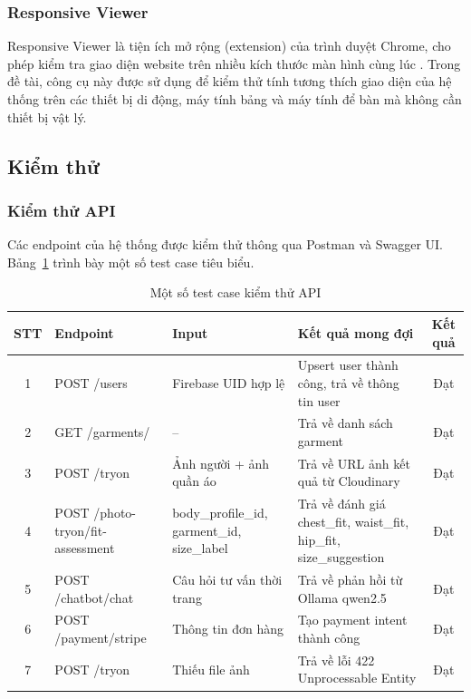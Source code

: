 \subsubsection{Responsive Viewer}
Responsive Viewer là tiện ích mở rộng (extension) của trình duyệt 
Chrome, cho phép kiểm tra giao diện website trên nhiều kích thước 
màn hình cùng lúc \cite{responsive_viewer}. Trong đề tài, công cụ 
này được sử dụng để kiểm thử tính tương thích giao diện của hệ 
thống trên các thiết bị di động, máy tính bảng và máy tính để bàn 
mà không cần thiết bị vật lý.

\subsection{Kiểm thử}

\subsubsection{Kiểm thử API}

Các endpoint của hệ thống được kiểm thử thông qua Postman và 
Swagger UI. Bảng~\ref{tab:api_test} trình bày một số test case 
tiêu biểu.
\begin{table}[H]
\centering
\caption{Một số test case kiểm thử API}
\label{tab:api_test}
\begin{tabular}{|c|p{3cm}|p{3cm}|p{3.5cm}|c|}
\hline
\textbf{STT} & \textbf{Endpoint} & \textbf{Input} & \textbf{Kết quả mong đợi} & \textbf{Kết quả} \\
\hline
1 & POST /users & Firebase UID hợp lệ & Upsert user thành công, trả về thông tin user & Đạt \\
\hline
2 & GET /garments/ & -- & Trả về danh sách garment & Đạt \\
\hline
3 & POST /tryon & Ảnh người + ảnh quần áo & Trả về URL ảnh kết quả từ Cloudinary & Đạt \\
\hline
4 & POST /photo-tryon/fit-assessment & body\_profile\_id, garment\_id, size\_label & Trả về đánh giá chest\_fit, waist\_fit, hip\_fit, size\_suggestion & Đạt \\
\hline
5 & POST /chatbot/chat & Câu hỏi tư vấn thời trang & Trả về phản hồi từ Ollama qwen2.5 & Đạt \\
\hline
6 & POST /payment/stripe & Thông tin đơn hàng & Tạo payment intent thành công & Đạt \\
\hline
7 & POST /tryon & Thiếu file ảnh & Trả về lỗi 422 Unprocessable Entity & Đạt \\
\hline
\end{tabular}
\end{table}

